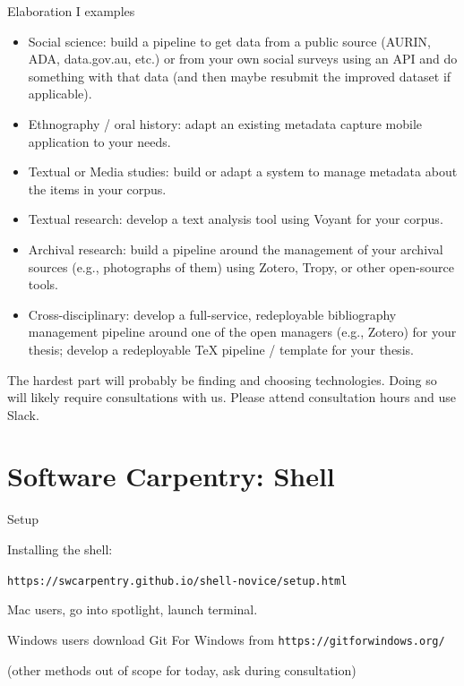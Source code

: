 \documentclass[aspectratio=1610, 11pt]{beamer} %
\begin{document}
\begin{frame}{Elaboration I examples}




\begin{itemize}[label=\textbullet]
    \item Social science: build a pipeline to get data from a public source (AURIN, ADA, data.gov.au, etc.) or from your own social surveys using an API and do something with that data (and then maybe resubmit the improved dataset if applicable).
    \item Ethnography / oral history: adapt an existing metadata capture mobile application to your needs.
    \item Textual or Media studies: build or adapt a system to manage metadata about the items in your corpus.
    \item Textual research: develop a text analysis tool using Voyant for your corpus.
    \item Archival research: build a pipeline around the management of your archival sources (e.g., photographs of them) using Zotero, Tropy, or other open-source tools.
    \item Cross-disciplinary: develop a full-service, redeployable bibliography management pipeline around one of the open managers (e.g., Zotero) for your thesis; develop a redeployable TeX pipeline / template for your thesis. 
\end{itemize}

The hardest part will probably be finding and choosing technologies. Doing so will likely require consultations with us. Please attend consultation hours and use Slack.

\end{frame}

\section{Software Carpentry: Shell}

\begin{frame}{Setup}

Installing the shell:

{\tt https://swcarpentry.github.io/shell-novice/setup.html}

Mac users, go into spotlight, launch terminal.

Windows users download Git For Windows from {\tt https://gitforwindows.org/}

(other methods out of scope for today, ask during consultation)
\end{frame}
\end{document}
